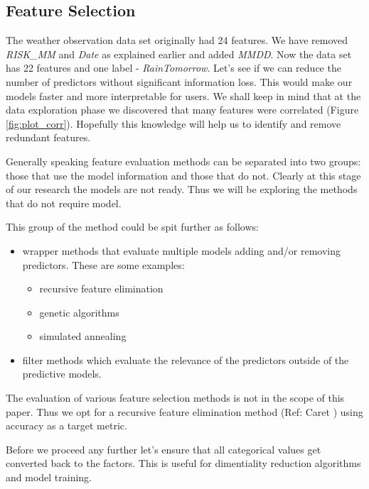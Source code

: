\hypertarget{feature-selection}{%
\subsection{Feature Selection}\label{feature-selection}}

The weather observation data set originally had 24 features. We have
removed \emph{RISK\_MM} and \emph{Date} as explained earlier and added
\emph{MMDD}. Now the data set has 22 features and one label -
\emph{RainTomorrow}. Let's see if we can reduce the number of predictors
without significant information loss. This would make our models faster
and more interpretable for users. We shall keep in mind that at the data
exploration phase we discovered that many features were correlated
(Figure \ref{fig:plot_corr}). Hopefully this knowledge will help us to
identify and remove redundant features.

Generally speaking feature evaluation methods can be separated into two
groups: those that use the model information and those that do not.
Clearly at this stage of our research the models are not ready. Thus we
will be exploring the methods that do not require model.

This group of the method could be spit further as follows:

\begin{itemize}
\tightlist
\item
  wrapper methods that evaluate multiple models adding and/or removing
  predictors. These are some examples:

  \begin{itemize}
  \tightlist
  \item
    recursive feature elimination
  \item
    genetic algorithms
  \item
    simulated annealing
  \end{itemize}
\item
  filter methods which evaluate the relevance of the predictors outside
  of the predictive models.
\end{itemize}

The evaluation of various feature selection methods is not in the scope
of this paper. Thus we opt for a recursive feature elimination method
(Ref: Caret \cite{caret}) using accuracy as a target metric.

Before we proceed any further let's ensure that all categorical values
get converted back to the factors. This is useful for dimentiality
reduction algorithms and model training.

